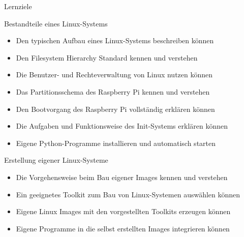 \begin{frame}{Lernziele}
    \begin{block}{Bestandteile eines Linux-Systems}
        \begin{itemize}
            \item Den typischen Aufbau eines Linux-Systems beschreiben können
            \item Den Filesystem Hierarchy Standard kennen und verstehen
            \item Die Benutzer- und Rechteverwaltung von Linux nutzen können
            \item Das Partitionsschema des Raspberry Pi kennen und verstehen
            \item Den Bootvorgang des Raspberry Pi vollständig erklären können
            \item Die Aufgaben und Funktionsweise des Init-Systems erklären können
            \item Eigene Python-Programme installieren und automatisch starten
        \end{itemize}
    \end{block}

    \begin{block}{Erstellung eigener Linux-Systeme}
        \begin{itemize}
            \item Die Vorgehensweise beim Bau eigener Images kennen und verstehen
            \item Ein geeignetes Toolkit zum Bau von Linux-Systemen auswählen können
            \item Eigene Linux Images mit den vorgestellten Toolkits erzeugen können
            \item Eigene Programme in die selbst erstellten Images integrieren können
        \end{itemize}
    \end{block}
\end{frame}

